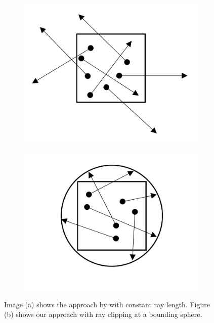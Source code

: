 \begin{figure}[ht]
    \centering
    \begin{subfigure}[b]{0.25\linewidth}
        \centering
        \includegraphics[width=\linewidth]{img/raygen_filtering_unclipped.png}
        \caption{}
        \label{fig:raygen_filtering_unclipped}
    \end{subfigure}
    \begin{subfigure}[b]{0.25\linewidth}
        \centering
        \includegraphics[width=1\linewidth]{img/raygen_filtering_clipped.png}
        \caption{}
        \label{fig:raygen_filtering_clipped}
    \end{subfigure}
	\caption[Approaches for determining a ray length for filtering]{Image (a) shows the approach by \citeauthor{hybrid_mesh_volume_lods} with constant ray length. Figure (b) shows our approach with ray clipping at a bounding sphere.}
	\label{fig:raygen_filtering}
\end{figure}

